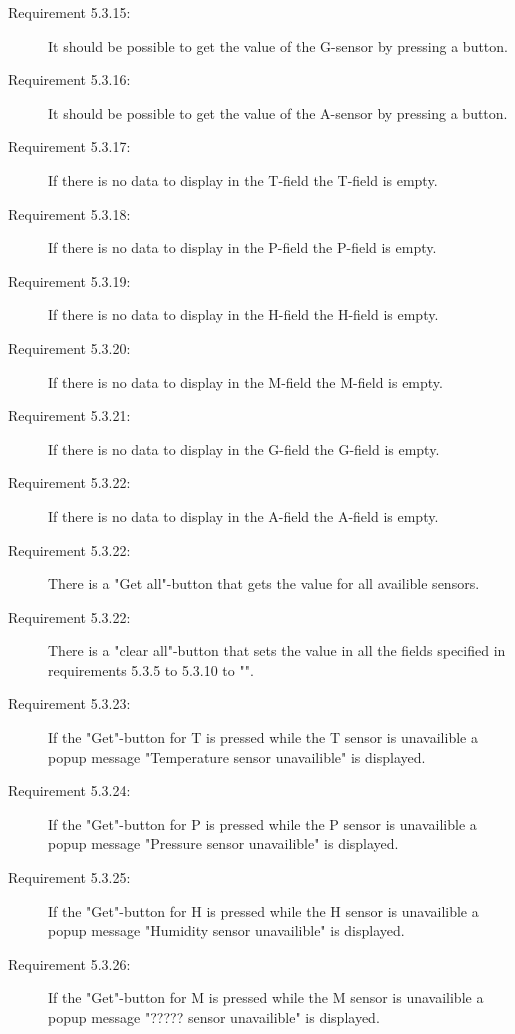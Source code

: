 \documentclass[a4paper]{article}
\begin{document}
\begin{description}
\item[Requirement 5.3.15:] It should be possible to get the value of the G-sensor by pressing a button.

\item[Requirement 5.3.16:] It should be possible to get the value of the A-sensor by pressing a button.

\item[Requirement 5.3.17:] If there is no data to display in the T-field the T-field is empty.

\item[Requirement 5.3.18:] If there is no data to display in the P-field the P-field is empty.

\item[Requirement 5.3.19:] If there is no data to display in the H-field the H-field is empty.

\item[Requirement 5.3.20:] If there is no data to display in the M-field the M-field is empty.

\item[Requirement 5.3.21:] If there is no data to display in the G-field the G-field is empty.

\item[Requirement 5.3.22:] If there is no data to display in the A-field the A-field is empty.

\item[Requirement 5.3.22:] There is a "Get all"-button that gets the value for all availible sensors.

\item[Requirement 5.3.22:] There is a "clear all"-button that sets the value in all the fields specified in requirements 5.3.5 to 5.3.10 to "".

\item[Requirement 5.3.23:] If the "Get"-button for T is pressed while the T sensor is unavailible a popup message "Temperature sensor unavailible" is displayed.

\item[Requirement 5.3.24:] If the "Get"-button for P is pressed while the P sensor is unavailible a popup message "Pressure sensor unavailible" is displayed.

\item[Requirement 5.3.25:] If the "Get"-button for H is pressed while the H sensor is unavailible a popup message "Humidity sensor unavailible" is displayed.

\item[Requirement 5.3.26:] If the "Get"-button for M is pressed while the M sensor is unavailible a popup message "????? sensor unavailible" is displayed.


\end{description}
\end{document}
